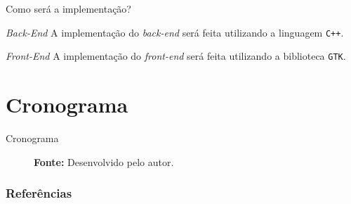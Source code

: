 \documentclass{beamer}
\begin{document}
    \begin{frame}{Como será a implementação?}

        \begin{block}{\textit{Back-End}}
            A implementação do \textit{back-end} será feita utilizando a linguagem \texttt{C++}.
        \end{block}
        \begin{block}{\textit{Front-End}}
            A implementação do \textit{front-end} será feita utilizando a biblioteca \texttt{GTK}.
        \end{block}
    \end{frame}
    \section{Cronograma}
    \begin{frame}{Cronograma}
        \begin{figure}
            \caption{\textbf{Fonte:} Desenvolvido pelo autor.}
        \end{figure}
    \end{frame}

    \begin{frame}
        \frametitle{Referências}
        \printbibliography
    \end{frame}
\end{document}
